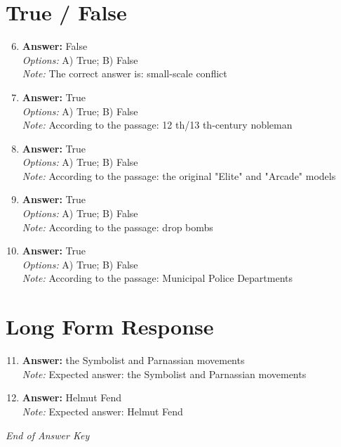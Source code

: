 \documentclass[12pt]{article}
\begin{document}
\section*{True / False}
\begin{enumerate}[label=\arabic*.]
\setcounter{enumi}{5}
\item \textbf{Answer:} False
\\ \textit{Options:} A) True; B) False
\\ \textit{Note:} The correct answer is: small-scale conflict
\item \textbf{Answer:} True
\\ \textit{Options:} A) True; B) False
\\ \textit{Note:} According to the passage: 12 th/13 th-century nobleman
\item \textbf{Answer:} True
\\ \textit{Options:} A) True; B) False
\\ \textit{Note:} According to the passage: the original "Elite" and "Arcade" models
\item \textbf{Answer:} True
\\ \textit{Options:} A) True; B) False
\\ \textit{Note:} According to the passage: drop bombs
\item \textbf{Answer:} True
\\ \textit{Options:} A) True; B) False
\\ \textit{Note:} According to the passage: Municipal Police Departments
\end{enumerate}

\section*{Long Form Response}
\begin{enumerate}[label=\arabic*.]
\setcounter{enumi}{10}
\item \textbf{Answer:} the Symbolist and Parnassian movements
\\ \textit{Note:} Expected answer: the Symbolist and Parnassian movements
\item \textbf{Answer:} Helmut Fend
\\ \textit{Note:} Expected answer: Helmut Fend
\end{enumerate}

\vfill
\noindent\textit{End of Answer Key}
\end{document}
